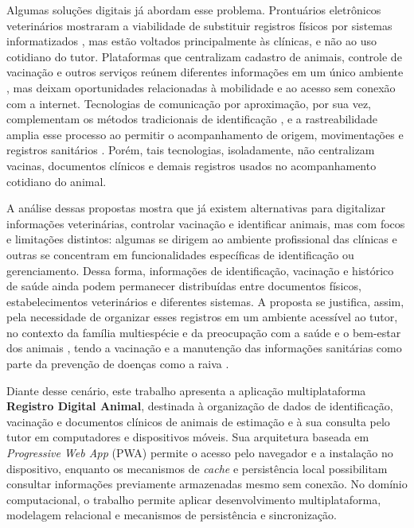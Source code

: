 \documentclass{UNESC}
\begin{document}
Algumas soluções digitais já abordam esse problema. Prontuários eletrônicos veterinários mostraram a viabilidade de substituir registros físicos por sistemas informatizados \cite{iskandar2023}, mas estão voltados principalmente às clínicas, e não ao uso cotidiano do tutor. Plataformas que centralizam cadastro de animais, controle de vacinação e outros serviços reúnem diferentes informações em um único ambiente \cite{vieira2025}, mas deixam oportunidades relacionadas à mobilidade e ao acesso sem conexão com a internet. Tecnologias de comunicação por aproximação, por sua vez, complementam os métodos tradicionais de identificação \cite{sartori2018}, e a rastreabilidade amplia esse processo ao permitir o acompanhamento de origem, movimentações e registros sanitários \cite{zhao2020}. Porém, tais tecnologias, isoladamente, não centralizam vacinas, documentos clínicos e demais registros usados no acompanhamento cotidiano do animal.

A análise dessas propostas mostra que já existem alternativas para digitalizar informações veterinárias, controlar vacinação e identificar animais, mas com focos e limitações distintos: algumas se dirigem ao ambiente profissional das clínicas e outras se concentram em funcionalidades específicas de identificação ou gerenciamento. Dessa forma, informações de identificação, vacinação e histórico de saúde ainda podem permanecer distribuídas entre documentos físicos, estabelecimentos veterinários e diferentes sistemas. A proposta se justifica, assim, pela necessidade de organizar esses registros em um ambiente acessível ao tutor, no contexto da família multiespécie e da preocupação com a saúde e o bem-estar dos animais \cite{VIEIRA2020}, tendo a vacinação e a manutenção das informações sanitárias como parte da prevenção de doenças como a raiva \cite{MOUTINHO2017,murphy2008}.

Diante desse cenário, este trabalho apresenta a aplicação multiplataforma \textbf{Registro Digital Animal}, destinada à organização de dados de identificação, vacinação e documentos clínicos de animais de estimação e à sua consulta pelo tutor em computadores e dispositivos móveis. Sua arquitetura baseada em \textit{Progressive Web App} (PWA) permite o acesso pelo navegador e a instalação no dispositivo, enquanto os mecanismos de \textit{cache} e persistência local possibilitam consultar informações previamente armazenadas mesmo sem conexão. No domínio computacional, o trabalho permite aplicar desenvolvimento multiplataforma, modelagem relacional e mecanismos de persistência e sincronização.
\end{document}
